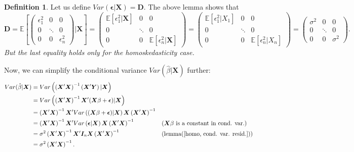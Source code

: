 \documentclass[11pt,a4paper]{amsart}
\theoremstyle{plain}
\theoremstyle{definition}
\newtheorem{definition}{Definition}
\begin{document}
	\begin{definition}
		Let us define $	Var( \bm{\epsilon}| \bm{X}) = \bm{D}$. The above lemma shows that 
		\[	\bm{D} =  \mathbb{E}\left[\begin{pmatrix}
		\epsilon_{1}^{2} &0 & 0  \\
		0&\ddots&0 \\
		0 &0&	\epsilon_{n}^{2}
		\end{pmatrix}\Big| \bm{X}\right] =  \begin{pmatrix}
		\mathbb{E}[\epsilon_{1}^{2} | \bm{X}]  &0 & 0  \\
		0&\ddots&0 \\
		0 &0&\mathbb{E}[\epsilon_{n}^{2} | \bm{X}]
		\end{pmatrix} =   \begin{pmatrix}
		\mathbb{E}[\epsilon_{1}^{2} | X_{1}]  &0 & 0  \\
		0&\ddots&0 \\
		0 &0&\mathbb{E}[\epsilon_{n}^{2} | X_{n}]
		\end{pmatrix} =    \begin{pmatrix}
		\sigma^{2}  &0 & 0  \\
		0&\ddots&0 \\
		0 &0&	\sigma^{2}  
		\end{pmatrix}. 	\]
		\emph{But the last equality holds only for the homoskedasticity case.}
	\end{definition}

	Now, we can simplify the conditional variance $Var(\hat{\beta} | \bm{X}) $ further:
	\[	\begin{aligned}
	Var(\hat{\beta} | \bm{X}) &= Var\left( \left(\bm{X}'\bm{X}\right)^{-1}\left(\bm{X}' \bm{Y}\right) | \bm{X} \right) \\
	&= Var\left( \left(\bm{X}'\bm{X}\right)^{-1} \bm{X}' (\bm{X}\beta + \bm{\epsilon}) | \bm{X} \right) \\
	&=  \left(\bm{X}'\bm{X}\right)^{-1} \bm{X}'  Var\left((\bm{X}\beta + \bm{\epsilon}) | \bm{X} \right) \bm{X} \left(\bm{X}'\bm{X}\right)^{-1} \\
	&= \left(\bm{X}'\bm{X}\right)^{-1} \bm{X}'  Var\left( \bm{\epsilon} | \bm{X} \right) \bm{X} \left(\bm{X}'\bm{X}\right)^{-1} &&\text{($\bm{X}\beta$ is a constant in cond. var.)}\\
	&=  \sigma^{2} \left(\bm{X}'\bm{X}\right)^{-1} \bm{X}'  \bm{I}_{n} \bm{X} \left(\bm{X}'\bm{X}\right)^{-1} &&\text{(lemma(\ref{homo, cond. var. resid.}))} \\
	&= \sigma^{2} \left(\bm{X}'\bm{X}\right)^{-1}.
	\end{aligned}	\]
	
\end{document}
